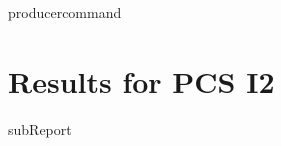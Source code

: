{{ producercommand }}
\renewcommand{\DTRPcs}{I2} %
\renewcommand{\DTRPcsLong}{I2}


    \section{Results for PCS \DTRPcsLong}

    {{subReport}}
    \newpage

